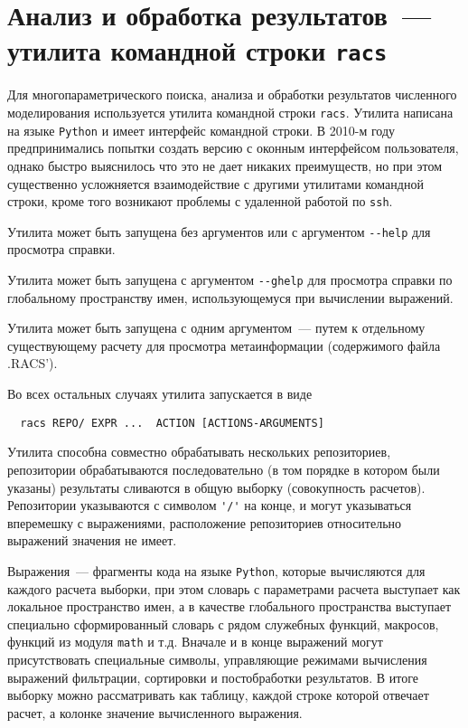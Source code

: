 \section{Анализ и обработка результатов~--- утилита командной строки {\tt racs}}
Для многопараметрического поиска, анализа и обработки результатов численного моделирования используется утилита командной строки \verb'racs'.
Утилита написана на языке \verb'Python' и имеет интерфейс командной строки. В 2010-м году предпринимались попытки создать
версию с оконным интерфейсом пользователя, однако быстро выяснилось что это не дает никаких преимуществ, но при этом
существенно усложняется взаимодействие с другими утилитами командной строки, кроме того возникают проблемы с удаленной работой по \verb'ssh'.

Утилита может быть запущена без аргументов или с аргументом \verb'--help' для просмотра справки.

Утилита может быть запущена с аргументом \verb'--ghelp' для просмотра справки по глобальному пространству имен, использующемуся при вычислении выражений.

Утилита может быть запущена с одним аргументом~--- путем к отдельному существующему расчету для
просмотра метаинформации (содержимого файла .RACS').

Во всех остальных случаях утилита запускается в виде
\begin{verbatim}
  racs REPO/ EXPR ...  ACTION [ACTIONS-ARGUMENTS]
\end{verbatim}

Утилита способна  совместно обрабатывать нескольких репозиториев,
репозитории обрабатываются последовательно (в том порядке в котором были указаны) результаты сливаются в общую выборку (совокупность расчетов).
Репозитории указываются с символом \verb|'/'| на конце, и могут указываться вперемешку с выражениями,
расположение репозиториев относительно выражений значения не имеет.

Выражения~--- фрагменты кода на языке \verb'Python', которые вычисляются для каждого расчета выборки, при этом словарь с параметрами
расчета выступает как локальное пространство имен,  а в качестве глобального пространства выступает специально сформированный словарь с рядом
служебных функций, макросов, функций из модуля \verb'math' и т.д. Вначале и в конце выражений могут присутствовать специальные символы,
управляющие режимами вычисления выражений фильтрации, сортировки и постобработки результатов. В итоге выборку можно рассматривать как таблицу,
каждой строке которой отвечает расчет, а колонке значение вычисленного выражения.

